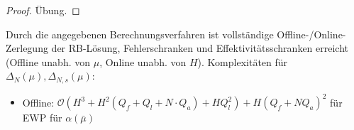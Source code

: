 \begin{proof}
	Übung.
\end{proof}

\begin{bem}[Komplexitäten]
	Durch die angegebenen Berechnungsverfahren ist vollständige Offline-/Online-Zerlegung der RB-Lösung, Fehlerschranken und Effektivitätsschranken erreicht (Offline unabh. von $\mu$, Online unabh. von $H$). Komplexitäten für $\Delta_N(\mu), \Delta_{N,s}(\mu)$:
	\begin{itemize}
		\item Offline: $\mathcal{O} (H^3 + H^2 (Q_f + Q_l + N \cdot Q_a) + H Q_l^2) + H(Q_f + NQ_a)^2$ für EWP für $\alpha(\bar{\mu})$
	\end{itemize}
\end{bem}